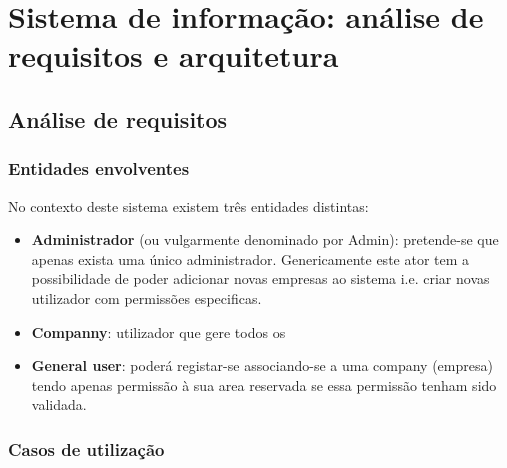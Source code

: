 

\chapter{Sistema de informação: análise de requisitos e arquitetura}






\section{Análise de requisitos}


\subsection{Entidades envolventes}


No contexto deste sistema existem três entidades distintas: 

\begin{itemize}
	\item \textbf{Administrador} (ou vulgarmente denominado por Admin): pretende-se que apenas exista uma único administrador. Genericamente este ator tem a possibilidade de poder adicionar novas empresas ao sistema i.e. criar novas utilizador com permissões especificas. 
	\item \textbf{Companny}: utilizador que gere todos os 
	\item \textbf{General user}: poderá registar-se associando-se a uma company (empresa) tendo apenas permissão à sua area reservada se essa permissão tenham sido validada. 
\end{itemize}



\newpage

\subsection{Casos de utilização}


